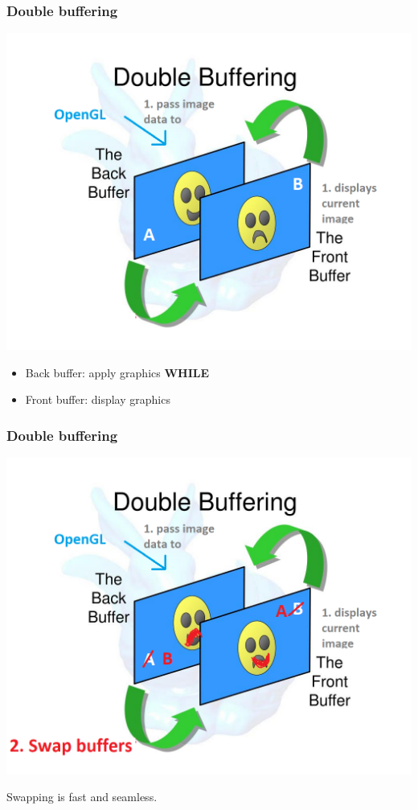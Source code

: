 \documentclass{beamer}
\begin{document}
\begin{frame}
    \frametitle{Double buffering}

    \begin{center}
        \includegraphics[scale=0.4]{q3-step1.png}
    \end{center}

    \begin{itemize}
        \item Back buffer: apply graphics \textbf{WHILE}
        \item Front buffer: display graphics 
    \end{itemize}

\end{frame}

\begin{frame}
    \frametitle{Double buffering}

    \begin{center}
        \includegraphics[scale=0.4]{q3-step2.png}
    \end{center}

    Swapping is fast and seamless.

\end{frame}
\end{document}
